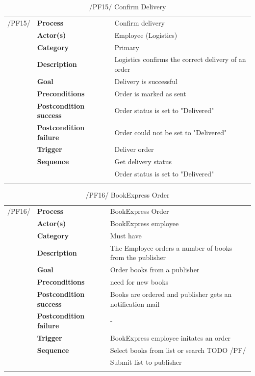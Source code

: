 \documentclass[11pt,a4paper,oneside,svgnames]{report}
\begin{document}
\begin{table}[H]
\centering
\begin{tabular}{p{1.5cm}p{3cm}p{8cm}}
\cellcolor{white}/PF15/	& \textbf{Process} & Confirm delivery\\
\cellcolor{white}		& \textbf{Actor(s)} & Employee (Logistics)\\
\cellcolor{white}		& \textbf{Category} & Primary\\
\cellcolor{white}		& \textbf{Description}	 & Logistics confirms the correct delivery of an order\\
\cellcolor{white}		& \textbf{Goal} & Delivery is successful\\
\cellcolor{white}		& \textbf{Preconditions} & Order is marked as sent\\
\cellcolor{white}		& \textbf{Postcondition success} & Order status is set to "Delivered"\\
\cellcolor{white}		& \textbf{Postcondition failure} & Order could not be set to "Delivered"\\
\cellcolor{white}		& \textbf{Trigger} & Deliver order\\
\cellcolor{white}		& \textbf{Sequence} & Get delivery status\\
\cellcolor{white}		& & Order status is set to "Delivered"\\
\cellcolor{white}\hfill \\
\end{tabular}
\caption{/PF15/ Confirm Delivery}
\label{tab:pf15}
\end{table}

\begin{table}[H]
\centering
\begin{tabular}{p{1.5cm}p{3cm}p{8cm}}
\cellcolor{white}/PF16/	& \textbf{Process} & BookExpress Order\\
\cellcolor{white}		& \textbf{Actor(s)} & BookExpress employee\\
\cellcolor{white}		& \textbf{Category} & Must have\\
\cellcolor{white}		& \textbf{Description}	 & The Employee orders a number of books from the publisher\\
\cellcolor{white}		& \textbf{Goal} & Order books from a publisher\\
\cellcolor{white}		& \textbf{Preconditions} & need for new books\\
\cellcolor{white}		& \textbf{Postcondition success} & Books are ordered and publisher gets an notification mail\\
\cellcolor{white}		& \textbf{Postcondition failure} & -\\
\cellcolor{white}		& \textbf{Trigger} & BookExpress employee initates an order\\
\cellcolor{white}		& \textbf{Sequence} & Select books from list or search TODO /PF/\\
\cellcolor{white}		& & Submit list to publisher\\
\cellcolor{white}\hfill \\
\end{tabular}
\caption{/PF16/ BookExpress Order}
\label{tab:pf16}
\end{table}
\end{document}
